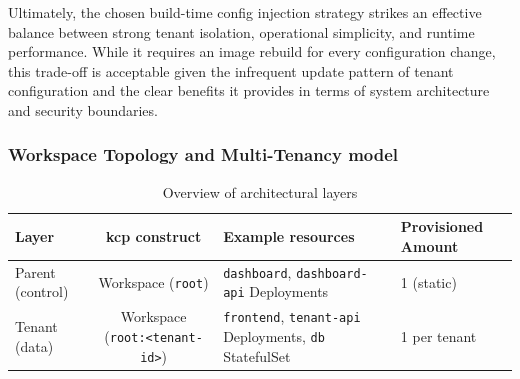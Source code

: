 \documentclass[11pt, a4paper, oneside, listof=totoc]{scrartcl}
\begin{document}
                Ultimately, the chosen build-time config injection strategy strikes an effective
                balance between strong tenant isolation, operational simplicity, and runtime
                performance.
                While it requires an image rebuild for every configuration change, this trade-off is
                acceptable given the infrequent update pattern of tenant configuration and the clear
                benefits it provides in terms of system architecture and security boundaries.
                \cleardoublepage

            \subsubsection{Workspace Topology and Multi-Tenancy model}\label{subsubsec:workspaceTopology}

                \begin{table}[H]\label{tab:layersOverview}
                    \centering
                    \renewcommand{\arraystretch}{1.5}
                    \begin{tabular}{lcp{4cm}P{8cm}}
                        \toprule
                        Layer & \gls{kcp} construct & Example resources & Provisioned Amount \\
                        \midrule
                        Parent (control) & Workspace (\texttt{root}) & \texttt{dashboard}, \texttt{dashboard-api} Deployments & 1 (static) \\
                        Tenant (data) & Workspace (\texttt{root:<tenant-id>}) & \texttt{frontend}, \texttt{tenant-api} Deployments, \texttt{\gls{db}} StatefulSet & 1 per tenant \\
                        \bottomrule
                    \end{tabular}
                    \caption{Overview of architectural layers}
                \end{table}
\end{document}

